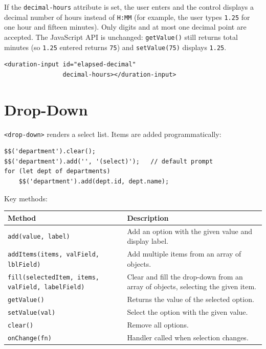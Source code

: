 If the \texttt{decimal-hours} attribute is set, the user enters and the control displays a decimal number of hours instead of \texttt{H:MM} (for example, the user types \texttt{1.25} for one hour and fifteen minutes).  Only digits and at most one decimal point are accepted.  The JavaScript API is unchanged: \texttt{getValue()} still returns total minutes (so \texttt{1.25} entered returns \texttt{75}) and \texttt{setValue(75)} displays \texttt{1.25}.

\begin{lstlisting}[style=html]
<duration-input id="elapsed-decimal"
                decimal-hours></duration-input>
\end{lstlisting}

\section{Drop-Down}
\label{sec:comp-dropdown}

\texttt{<drop-down>} renders a select list.  Items are added programmatically:

\begin{lstlisting}[style=javascript]
$$('department').clear();
$$('department').add('', '(select)');   // default prompt
for (let dept of departments)
    $$('department').add(dept.id, dept.name);
\end{lstlisting}

\noindent
Key methods:

\begin{longtable}{P{4.8cm}P{5.7cm}}
\toprule
\textbf{Method} & \textbf{Description} \\
\midrule
\endhead
\texttt{add(value, label)} & Add an option with the given value and display label. \\
\texttt{addItems(items, valField, lblField)} & Add multiple items from an array of objects. \\
\texttt{fill(selectedItem, items, valField, labelField)} & Clear and fill the drop-down from an array of objects, selecting the given item. \\
\texttt{getValue()} & Returns the value of the selected option. \\
\texttt{setValue(val)} & Select the option with the given value. \\
\texttt{clear()} & Remove all options. \\
\texttt{onChange(fn)} & Handler called when selection changes. \\
\bottomrule
\end{longtable}

